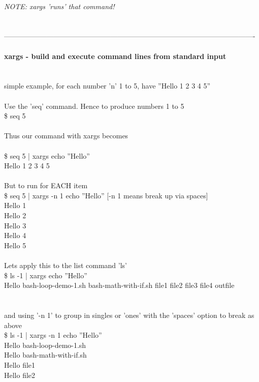 \documentclass[10pt,a4paper]{article}
\begin{document}
{\\
\textit{NOTE: xargs 'runs' that command!}}{\Large \\
\\
\\
----------------------------------------------------------------------------------------------------------\\
\textbf{\\
xargs - build and execute command lines from standard input}}{\Large \\
\\
\\
simple example, for each number 'n' 1 to 5,  have ''Hello 1 2 3 4 5''\\
\\
Use the 'seq' command. Hence to produce numbers 1 to 5 \\
\$ seq 5\\
\\
Thus our command with xargs becomes\\
\\
\$ seq 5 | xargs echo ''Hello''\\
Hello 1 2 3 4 5 \\
\\
But to run for EACH item\\
\$ seq 5 | xargs -n 1 echo ''Hello''   	[-n 1 means break up via spaces]\\
}{\large Hello 1\\
Hello 2\\
Hello 3\\
Hello 4\\
Hello 5}{\Large \\
\\
Lets apply this to the list command 'ls'\\
\$ ls -1 | xargs echo ''Hello''\\
}{\large Hello bash-loop-demo-1.sh bash-math-with-if.sh file1 file2 file3 file4 outfile}{\Large \\
\\
\\
and using '-n 1' to group in singles or 'ones' with the 'spaces' option to break as above\\
\$ ls -1 | xargs -n 1 echo ''Hello''\\
}{\large Hello bash-loop-demo-1.sh\\
Hello bash-math-with-if.sh\\
Hello file1\\
Hello file2\\
}
\end{document}

